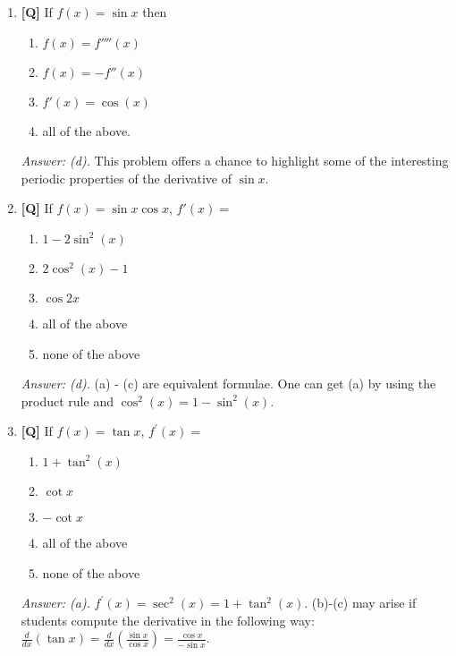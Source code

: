 \documentclass[12pt]{article}
\begin{document}
\begin{enumerate}
{\it Answer: (b).} Note that this is the derivative of $\sin x$ at 0, that is, 
the slope of the function $\sin x$ at 0 is 1. So the tangent to the graph $(0,0)$ is the line
$y=x$. Students will have trouble identifying the limit as a derivative, and also thinking of 
the derivative at 0 as the slope of the function (and of the tangent) at 0.

\bigskip

\item {\bf [Q]} If $f(x)=\sin x$ then

\begin{enumerate}
\item $f(x) = f ''''(x)$
\item $f(x) = -f '' (x)$
\item $f '(x) = \cos(x)$
\item all of the above.
\end{enumerate}

{\it Answer: (d).} This problem offers a chance to highlight 
some of the interesting periodic properties of the derivative of
$\sin x$.

\bigskip

\item {\bf [Q]} If $f(x)= \sin x \cos x$, $f'(x)=$
\begin{enumerate}
\item $1-2\sin^2(x)$
\item $2\cos^2(x) -1$
\item $\cos 2x$
\item all of the above
\item none of the above
\end{enumerate}

{\it Answer: (d).} (a) - (c) are equivalent formulae. One can get (a) by using the product rule and $\cos^2(x)=1-\sin ^2(x)$.

\bigskip

\item {\bf [Q]} If $f(x) =\tan x$, $f^{\prime}(x) =$
\begin{enumerate}
\item  $1+ \tan^2(x)$
\item $\cot x$
\item $-\cot x$
\item all of the above
\item none of the above
\end{enumerate}

{\it Answer: (a).} $f^{\prime}(x) =\sec ^2(x)=1+\tan ^2(x)$. (b)-(c) may arise if students compute the derivative in the following way:
 $\displaystyle{\frac{d}{dx}(\tan x)=\frac{d}{dx}\left(\frac{\sin x}{\cos x}\right)=\frac{\cos x}{-\sin x}}$.


\end{enumerate}
\end{document}
